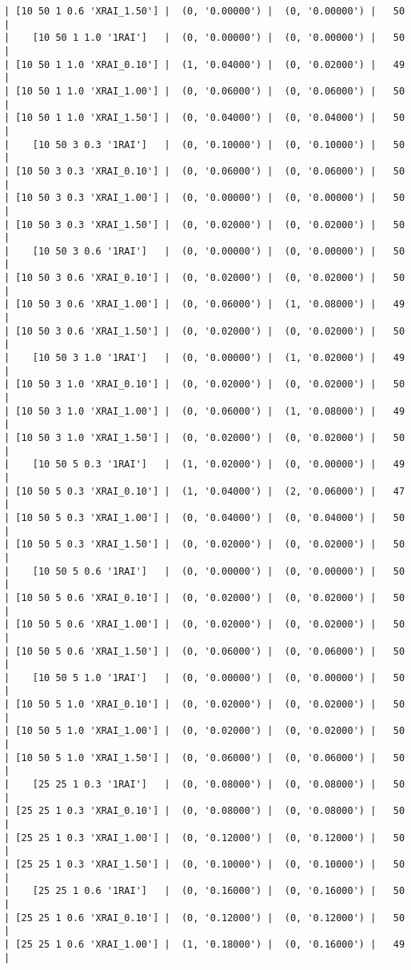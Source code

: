 \documentclass{article}
\begin{document}
\begin{verbatim}
| [10 50 1 0.6 'XRAI_1.50'] |  (0, '0.00000') |  (0, '0.00000') |   50  |
|    [10 50 1 1.0 '1RAI']   |  (0, '0.00000') |  (0, '0.00000') |   50  |
| [10 50 1 1.0 'XRAI_0.10'] |  (1, '0.04000') |  (0, '0.02000') |   49  |
| [10 50 1 1.0 'XRAI_1.00'] |  (0, '0.06000') |  (0, '0.06000') |   50  |
| [10 50 1 1.0 'XRAI_1.50'] |  (0, '0.04000') |  (0, '0.04000') |   50  |
|    [10 50 3 0.3 '1RAI']   |  (0, '0.10000') |  (0, '0.10000') |   50  |
| [10 50 3 0.3 'XRAI_0.10'] |  (0, '0.06000') |  (0, '0.06000') |   50  |
| [10 50 3 0.3 'XRAI_1.00'] |  (0, '0.00000') |  (0, '0.00000') |   50  |
| [10 50 3 0.3 'XRAI_1.50'] |  (0, '0.02000') |  (0, '0.02000') |   50  |
|    [10 50 3 0.6 '1RAI']   |  (0, '0.00000') |  (0, '0.00000') |   50  |
| [10 50 3 0.6 'XRAI_0.10'] |  (0, '0.02000') |  (0, '0.02000') |   50  |
| [10 50 3 0.6 'XRAI_1.00'] |  (0, '0.06000') |  (1, '0.08000') |   49  |
| [10 50 3 0.6 'XRAI_1.50'] |  (0, '0.02000') |  (0, '0.02000') |   50  |
|    [10 50 3 1.0 '1RAI']   |  (0, '0.00000') |  (1, '0.02000') |   49  |
| [10 50 3 1.0 'XRAI_0.10'] |  (0, '0.02000') |  (0, '0.02000') |   50  |
| [10 50 3 1.0 'XRAI_1.00'] |  (0, '0.06000') |  (1, '0.08000') |   49  |
| [10 50 3 1.0 'XRAI_1.50'] |  (0, '0.02000') |  (0, '0.02000') |   50  |
|    [10 50 5 0.3 '1RAI']   |  (1, '0.02000') |  (0, '0.00000') |   49  |
| [10 50 5 0.3 'XRAI_0.10'] |  (1, '0.04000') |  (2, '0.06000') |   47  |
| [10 50 5 0.3 'XRAI_1.00'] |  (0, '0.04000') |  (0, '0.04000') |   50  |
| [10 50 5 0.3 'XRAI_1.50'] |  (0, '0.02000') |  (0, '0.02000') |   50  |
|    [10 50 5 0.6 '1RAI']   |  (0, '0.00000') |  (0, '0.00000') |   50  |
| [10 50 5 0.6 'XRAI_0.10'] |  (0, '0.02000') |  (0, '0.02000') |   50  |
| [10 50 5 0.6 'XRAI_1.00'] |  (0, '0.02000') |  (0, '0.02000') |   50  |
| [10 50 5 0.6 'XRAI_1.50'] |  (0, '0.06000') |  (0, '0.06000') |   50  |
|    [10 50 5 1.0 '1RAI']   |  (0, '0.00000') |  (0, '0.00000') |   50  |
| [10 50 5 1.0 'XRAI_0.10'] |  (0, '0.02000') |  (0, '0.02000') |   50  |
| [10 50 5 1.0 'XRAI_1.00'] |  (0, '0.02000') |  (0, '0.02000') |   50  |
| [10 50 5 1.0 'XRAI_1.50'] |  (0, '0.06000') |  (0, '0.06000') |   50  |
|    [25 25 1 0.3 '1RAI']   |  (0, '0.08000') |  (0, '0.08000') |   50  |
| [25 25 1 0.3 'XRAI_0.10'] |  (0, '0.08000') |  (0, '0.08000') |   50  |
| [25 25 1 0.3 'XRAI_1.00'] |  (0, '0.12000') |  (0, '0.12000') |   50  |
| [25 25 1 0.3 'XRAI_1.50'] |  (0, '0.10000') |  (0, '0.10000') |   50  |
|    [25 25 1 0.6 '1RAI']   |  (0, '0.16000') |  (0, '0.16000') |   50  |
| [25 25 1 0.6 'XRAI_0.10'] |  (0, '0.12000') |  (0, '0.12000') |   50  |
| [25 25 1 0.6 'XRAI_1.00'] |  (1, '0.18000') |  (0, '0.16000') |   49  |

\end{verbatim}
\end{document}
